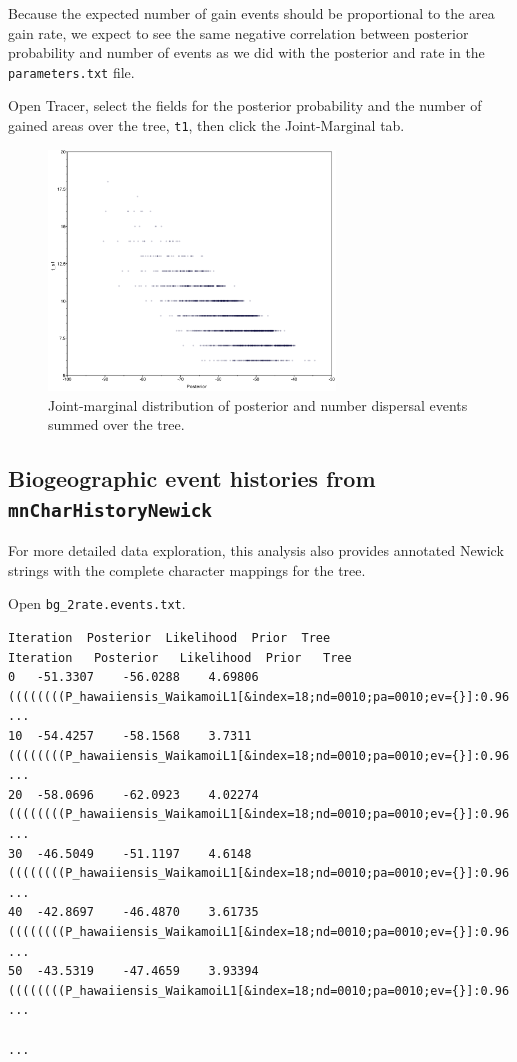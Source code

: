 \documentclass[11pt]{article}
\begin{document}
Because the expected number of gain events should be proportional to the area gain rate, we expect to see the same negative correlation between posterior probability and number of events as we did with the posterior and rate in the {\tt parameters.txt} file.

Open Tracer, select the fields for the posterior probability and the number of gained areas over the tree, {\tt t1}, then click the Joint-Marginal tab.

\begin{figure}[H]
\centering
\includegraphics[width=3in]{figures/joint_ngain_posterior}
\caption{Joint-marginal distribution of posterior and number dispersal events summed over the tree.}
\end{figure}


\subsection{Biogeographic event histories from {\tt mnCharHistoryNewick}}

For more detailed data exploration, this analysis also provides annotated Newick strings with the complete character mappings for the tree.

Open {\tt bg\_2rate.events.txt}.

\begin{framed}
\begin{lstlisting}[basicstyle=\tiny \listingsfont, columns=texcl]
Iteration  Posterior  Likelihood  Prior  Tree
Iteration	Posterior	Likelihood	Prior	Tree
0	-51.3307	-56.0288	4.69806	((((((((P_hawaiiensis_WaikamoiL1[&index=18;nd=0010;pa=0010;ev={}]:0.96 ...
10	-54.4257	-58.1568	3.7311	((((((((P_hawaiiensis_WaikamoiL1[&index=18;nd=0010;pa=0010;ev={}]:0.96 ...
20	-58.0696	-62.0923	4.02274	((((((((P_hawaiiensis_WaikamoiL1[&index=18;nd=0010;pa=0010;ev={}]:0.96 ...
30	-46.5049	-51.1197	4.6148	((((((((P_hawaiiensis_WaikamoiL1[&index=18;nd=0010;pa=0010;ev={}]:0.96 ...
40	-42.8697	-46.4870	3.61735	((((((((P_hawaiiensis_WaikamoiL1[&index=18;nd=0010;pa=0010;ev={}]:0.96 ...
50	-43.5319	-47.4659	3.93394	((((((((P_hawaiiensis_WaikamoiL1[&index=18;nd=0010;pa=0010;ev={}]:0.96 ...

...
\end{lstlisting}
\end{framed}
\end{document}
